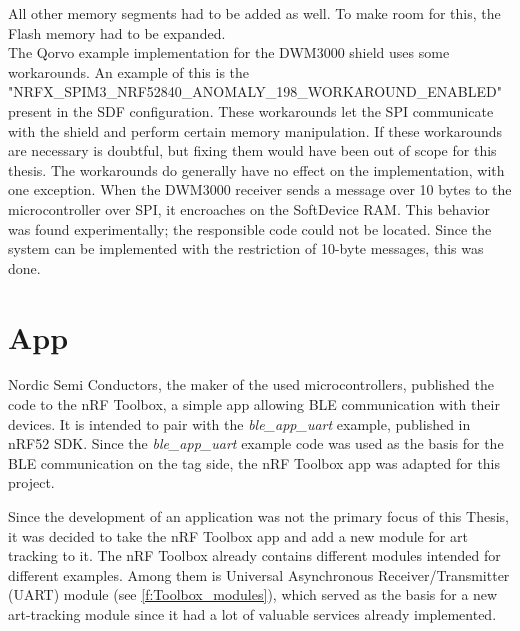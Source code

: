 All other memory segments had to be added as well. 
To make room for this, the Flash memory had to be expanded. \\
The Qorvo example implementation for the DWM3000 shield uses some workarounds. An example of this is the "NRFX{\_}SPIM3{\_}NRF52840{\_}ANOMALY{\_}198{\_}WORKAROUND{\_}ENABLED" present in the SDF configuration. These workarounds let the SPI communicate with the shield and perform certain memory manipulation. 
If these workarounds are necessary is doubtful, but fixing them would have been out of scope for this thesis.
The workarounds do generally have no effect on the implementation, with one exception. 
When the DWM3000 receiver sends a message over 10 bytes to the microcontroller over SPI, it encroaches on the SoftDevice RAM.
This behavior was found experimentally; the responsible code could not be located. 
Since the system can be implemented with the restriction of 10-byte messages, this was done.



\section{App}
\label{s:app}
Nordic Semi Conductors, the maker of the used microcontrollers, published the code to the nRF Toolbox, a simple app allowing BLE communication with their devices.
It is intended to pair with the \textit{ble{\_}app{\_}uart} example, published in nRF52 SDK.
Since the \textit{ble{\_}app{\_}uart} example code was used as the basis for the BLE communication on the tag side, the nRF Toolbox app was adapted for this project.

Since the development of an application was not the primary focus of this Thesis, it was decided to take the nRF Toolbox app and add a new module for art tracking to it.
The nRF Toolbox already contains different modules intended for different examples.
Among them is Universal Asynchronous Receiver/Transmitter (UART) module (see \ref{f:Toolbox_modules}), which served as the basis for a new art-tracking module since it had a lot of valuable services already implemented.

